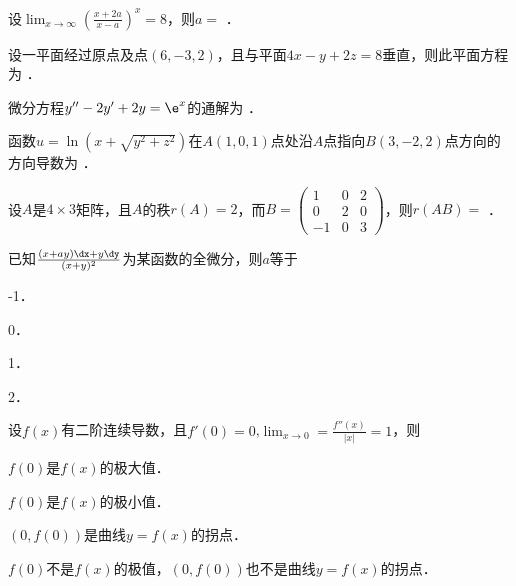 \documentclass[plain,noanswer,medmath]{../../template/jnuexam}
\begin{document}




\begin{problem}
设$\lim_{x \to \infty} \left(\frac{x + 2a}{x - a} \right)^x = 8$，则$a =$ \fillin{}．
\end{problem}


\begin{problem}
设一平面经过原点及点$(6, - 3,2)$，且与平面$4x - y + 2z = 8$垂直，则此平面方程为 \fillin{}．
\end{problem}


\begin{problem}
微分方程$y'' - 2y' + 2y = \e^x$的通解为 \fillin{}．
\end{problem}


\begin{problem}
函数$u=\ln(x+\sqrt{y^2+z^2})$在$A(1,0,1)$点处沿$A$点指向$B(3,-2,2)$点方向的方向导数为 \fillin{}．
\end{problem}


\begin{problem}
设$A$是$4 \times 3$矩阵，且$A$的秩$r(A) = 2$，而$B = \begin{pmatrix}
   1 & 0 & 2 \\
   0 & 2 & 0 \\
  -1 & 0 & 3
\end{pmatrix}$，则$r(AB) =$ \fillin{}．
\end{problem}




\begin{problem}
已知$\frac{(x + ay)\dx + y\dy}{(x + y)^2}$为某函数的全微分，则$a$等于\pickout{}
\begin{abcd}
\item -1．        
\item 0．        
\item 1．        
\item 2．
\end{abcd}
\end{problem}


\begin{problem}
设$f(x)$有二阶连续导数，且$f'(0) = 0$,$\lim_{x \to 0} = \frac{f''(x)}{|x|} = 1$，则\pickout{}
\begin{abcd}
\item $f(0)$是$f(x)$的极大值．
\item $f(0)$是$f(x)$的极小值．
\item $(0,f(0))$是曲线$y = f(x)$的拐点．
\item $f(0)$不是$f(x)$的极值，$(0,f(0))$也不是曲线$y = f(x)$的拐点． 
\end{abcd}
\end{problem}
\end{document}

